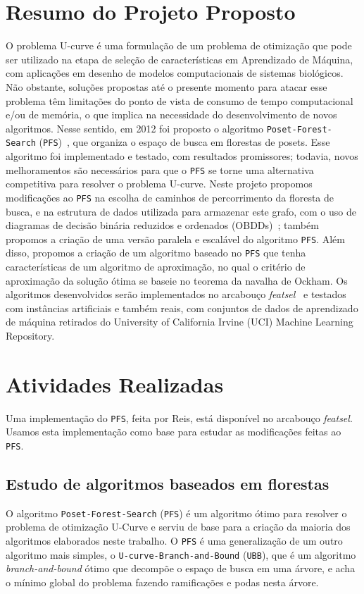 \documentclass[12pt]{article}
\newcommand{\foreignword}[1]{\textit{#1}}
\newcommand{\toolname}[1]{\textit{#1}}
\newcommand{\algname}[1]{\texttt{#1}}
\begin{document}
\section{Resumo do Projeto Proposto} \label{sec:resumo} %
O problema U-curve é uma formulação de um problema de otimização que 
pode ser utilizado na etapa de seleção de características em 
Aprendizado de Máquina, com aplicações em desenho de modelos 
computacionais de sistemas biológicos. Não obstante, soluções propostas 
até o presente momento para atacar esse problema têm limitações do 
ponto de vista de consumo de tempo computacional e/ou de memória, o que 
implica na necessidade do desenvolvimento de novos algoritmos. Nesse 
sentido, em 2012 foi proposto o algoritmo 
\algname{Poset\--Forest\--Search} (\algname{PFS})~\cite{msreis thesis}, 
que organiza o espaço de busca em florestas de posets. Esse algoritmo 
foi implementado e testado, com resultados promissores; todavia, novos 
melhoramentos são necessários para que o \algname{PFS} se torne uma 
alternativa competitiva para resolver o problema U-curve. Neste projeto 
propomos modificações ao \algname{PFS} na escolha de caminhos de 
percorrimento da floresta de busca, e na estrutura de dados utilizada 
para armazenar este grafo, com o uso de diagramas de decisão binária 
reduzidos e ordenados (OBDDs)~\cite{bryant}; também propomos a criação 
de uma versão paralela e escalável do algoritmo \algname{PFS}. Além 
disso, propomos a criação de um algoritmo baseado no \algname{PFS} que 
tenha características de um algoritmo de aproximação, no qual o critério 
de aproximação da solução ótima se baseie no teorema da navalha de 
Ockham. Os algoritmos desenvolvidos serão implementados no arcabouço 
\toolname{featsel}~\cite{featsel paper} e testados com instâncias 
artificiais e também reais, com conjuntos de dados de aprendizado de 
máquina retirados do University of California Irvine (UCI) Machine 
Learning Repository.

 
\section{Atividades Realizadas}

Uma implementação do \algname{PFS}, feita por Reis, está disponível no
arcabouço \toolname{featsel}. Usamos esta implementação como base para
estudar as modificações feitas ao \algname{PFS}.

\subsection{Estudo de algoritmos baseados em florestas}
O algoritmo \algname{Poset\--Forest\--Search} (\algname{PFS}) é um 
algoritmo ótimo para resolver o problema de otimização U-Curve e serviu 
de base para a criação da maioria dos algoritmos elaborados neste 
trabalho. O \algname{PFS} é uma generalização de um outro algoritmo mais
simples, o \algname{U-curve-Branch-and-Bound} (\algname{UBB}), que é
um algoritmo \foreignword{branch-and-bound} ótimo que decompõe o espaço
de busca em uma árvore, e acha o mínimo global do problema fazendo 
ramificações e podas nesta árvore.
\end{document}
